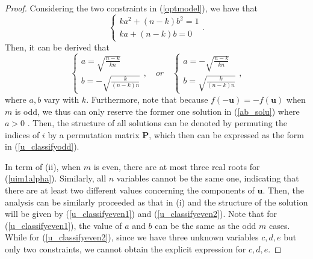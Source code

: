 \begin{proof}
Considering  the  two constraints  in  (\ref{optmodel}), we  have  that 
\begin{equation}\label{ab_expreess}
\begin{cases}
k a^{2}+(n-k) b^{2}=1 \\
k a+(n-k) b=0
\end{cases}. 
\end{equation}
Then, it can be derived that 
\begin{equation}\label{ab_solu}
\begin{cases}
a=   \sqrt{	\frac{n-k} {k n}		} \\
b=-  \sqrt{	\frac{k} {(n-k) n}	}  
\end{cases},
\quad  or  \quad 
\begin{cases}
a=   - \sqrt{	\frac{n-k} {k n}		} \\
b=  \sqrt{	\frac{k} {(n-k) n}	}  
\end{cases},
\end{equation}
where  
$ a, b  $ vary with $k$. %
Furthermore, note  that   because  
 $ f ( -\mathbf  u ) = -  f (\mathbf  u) $  when  $m$ is odd,
we thus can   only reserve   the former  one solution   in (\ref{ab_solu})  where  $ a>0$ .
Then,  the  structure of  all   solutions
can be  denoted  by 
permuting the  indices  of  $i$  by  a  permutation matrix $\mathbf P$, which then  
can be  expressed as  the form in 
(\ref{u_classifyodd}).

In term of (ii), 
when $m$ is  even, 
there  are  at  most  three  real  roots for 
(\ref{uim1alpha}).
Similarly,  all $n$  variables  cannot be the same one, indicating  that there  are  at  least  two  different  values  concerning  the components of $\mathbf  u$.
Then, the  analysis can be similarly  proceeded  as  that  in (i)
and  the structure  of  
the solution will be  given by 
(\ref{u_classifyeven1})
and 
(\ref{u_classifyeven2}).
Note that 
for  (\ref{u_classifyeven1}), 
the value of $a$ and $b$ can be the same as the odd $m$ cases.
While 
for 
(\ref{u_classifyeven2}), 
since we have  three  unknown  variables $c,d,e$
but only  two  constraints, we cannot 
obtain the  explicit  expression  for $c,d,e$.









\end{proof}
